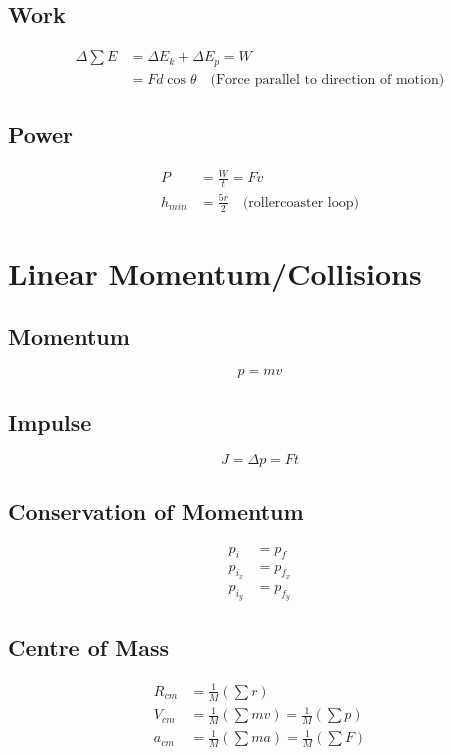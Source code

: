 \documentclass[letterpaper,10pt]{article}
\begin{document}
\begin{multicols}{2}
\subsection{Work}
\begin{align*}
    \Delta \sum E &= \Delta E_k + \Delta E_p = W \\
    &= F d \cos \theta \quad \textrm{(Force parallel to direction of motion)}
\end{align*}

\subsection{Power}
\begin{align*}
    P &= \frac{W}{t} = Fv \\
    h_{min} &= \frac{5r}{2} \quad \textrm{(rollercoaster loop)}
\end{align*}

\section{Linear Momentum/Collisions}
\subsection{Momentum}
\begin{equation*}
    p = mv
\end{equation*}

\subsection{Impulse}
\begin{equation*}
    J = \Delta p = F t
\end{equation*}

\subsection{Conservation of Momentum}
\begin{align*}
    p_i &= p_f \\
    p_{i_x} &= p_{f_x} \\
    p_{i_y} &= p_{f_y}
\end{align*}

\subsection{Centre of Mass}
\begin{align*}
    R_{cm} &= \frac{1}{M} \left( \sum r \right) \\
    V_{cm} &= \frac{1}{M} \left( \sum mv \right) = \frac{1}{M} \left( \sum p \right) \\
    a_{cm} &= \frac{1}{M} \left( \sum ma \right) = \frac{1}{M} \left( \sum F \right)
\end{align*}


\end{multicols}
\end{document}
